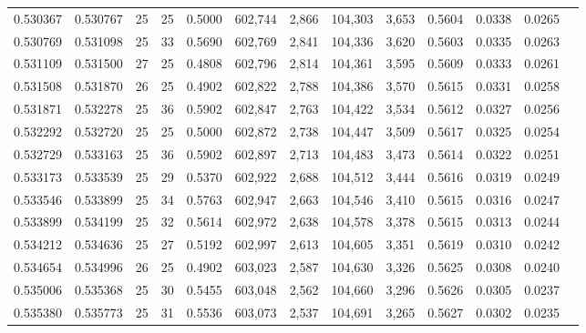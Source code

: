 \begin{tabular}{rrrrrrrrrrrrr}
0.530367 & 0.530767 &    25 &  25 &                                     0.5000 & 602,744 &   2,866 & 104,303 &   3,653 & 0.5604 & 0.0338 & 0.0265 \\
0.530769 & 0.531098 &    25 &  33 &                                     0.5690 & 602,769 &   2,841 & 104,336 &   3,620 & 0.5603 & 0.0335 & 0.0263 \\
0.531109 & 0.531500 &    27 &  25 &                                     0.4808 & 602,796 &   2,814 & 104,361 &   3,595 & 0.5609 & 0.0333 & 0.0261 \\
0.531508 & 0.531870 &    26 &  25 &                                     0.4902 & 602,822 &   2,788 & 104,386 &   3,570 & 0.5615 & 0.0331 & 0.0258 \\
0.531871 & 0.532278 &    25 &  36 &                                     0.5902 & 602,847 &   2,763 & 104,422 &   3,534 & 0.5612 & 0.0327 & 0.0256 \\
0.532292 & 0.532720 &    25 &  25 &                                     0.5000 & 602,872 &   2,738 & 104,447 &   3,509 & 0.5617 & 0.0325 & 0.0254 \\
0.532729 & 0.533163 &    25 &  36 &                                     0.5902 & 602,897 &   2,713 & 104,483 &   3,473 & 0.5614 & 0.0322 & 0.0251 \\
0.533173 & 0.533539 &    25 &  29 &                                     0.5370 & 602,922 &   2,688 & 104,512 &   3,444 & 0.5616 & 0.0319 & 0.0249 \\
0.533546 & 0.533899 &    25 &  34 &                                     0.5763 & 602,947 &   2,663 & 104,546 &   3,410 & 0.5615 & 0.0316 & 0.0247 \\
0.533899 & 0.534199 &    25 &  32 &                                     0.5614 & 602,972 &   2,638 & 104,578 &   3,378 & 0.5615 & 0.0313 & 0.0244 \\
0.534212 & 0.534636 &    25 &  27 &                                     0.5192 & 602,997 &   2,613 & 104,605 &   3,351 & 0.5619 & 0.0310 & 0.0242 \\
0.534654 & 0.534996 &    26 &  25 &                                     0.4902 & 603,023 &   2,587 & 104,630 &   3,326 & 0.5625 & 0.0308 & 0.0240 \\
0.535006 & 0.535368 &    25 &  30 &                                     0.5455 & 603,048 &   2,562 & 104,660 &   3,296 & 0.5626 & 0.0305 & 0.0237 \\
0.535380 & 0.535773 &    25 &  31 &                                     0.5536 & 603,073 &   2,537 & 104,691 &   3,265 & 0.5627 & 0.0302 & 0.0235 \\

\end{tabular}
